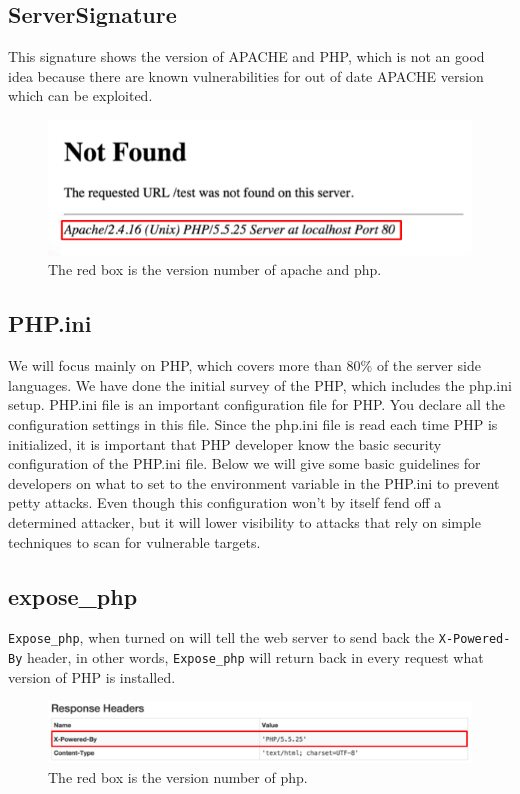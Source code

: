 \documentclass[conference]{IEEEtran}
\begin{document}
\subsection{ServerSignature}
This signature shows the version of APACHE and PHP, which is not an good idea because there are known vulnerabilities for out of date APACHE version which can be exploited.
\begin{figure}[h]
\includegraphics[scale=0.3]{serversignature}
\centering
\caption{The red box is the version number of apache and php.}
\end{figure}


\subsection{PHP.ini}
We will focus mainly on PHP, which covers more than $80\%$ \cite{PHPusuage} of the server side languages. We have done the initial
survey of the PHP, which includes the php.ini setup.
PHP.ini file is an important configuration file for PHP. You declare all the configuration settings in this file. Since the php.ini file is read each time PHP is initialized, it is important that
PHP developer know the basic security configuration of the PHP.ini file. Below we will give some basic guidelines for developers on what to set to the environment variable in the PHP.ini
to prevent petty attacks. Even though this configuration won't by itself fend off a determined attacker, but it will lower visibility to attacks that rely on simple techniques to scan for vulnerable targets\cite{phpini}.
 
\subsection{expose\_php}
\texttt{Expose\_php}, when turned on will tell the web server to send back the \texttt{X-Powered-By} header, in other words, \texttt{Expose\_php} will return back in every request what version of PHP is installed.

\begin{figure}[h]
\includegraphics[scale=0.5]{exposephp}
\centering
\caption{The red box is the version number of php.}
\end{figure}
\end{document}
